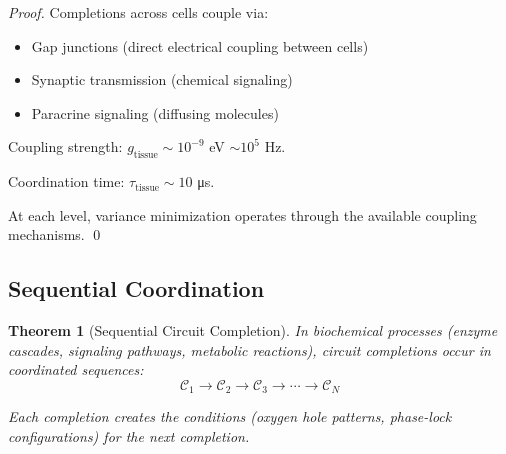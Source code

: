 \documentclass[12pt,a4paper]{article}
\newtheorem{theorem}{Theorem}
\begin{document}
\begin{proof}
Completions across cells couple via:
\begin{itemize}
\item Gap junctions (direct electrical coupling between cells)
\item Synaptic transmission (chemical signaling)
\item Paracrine signaling (diffusing molecules)
\end{itemize}

Coupling strength: $g_{\text{tissue}} \sim 10^{-9}$ eV $\sim 10^{5}$ Hz.

Coordination time: $\tau_{\text{tissue}} \sim 10$ μs.

At each level, variance minimization operates through the available coupling mechanisms. \qed
\end{proof}

\subsection{Sequential Coordination}

\begin{theorem}[Sequential Circuit Completion]
\label{thm:sequential_completion}
In biochemical processes (enzyme cascades, signaling pathways, metabolic reactions), circuit completions occur in coordinated \textit{sequences}:
\begin{equation}
\mathcal{C}_1 \to \mathcal{C}_2 \to \mathcal{C}_3 \to \cdots \to \mathcal{C}_N
\end{equation}

Each completion creates the conditions (oxygen hole patterns, phase-lock configurations) for the next completion.
\end{theorem}
\end{document}
